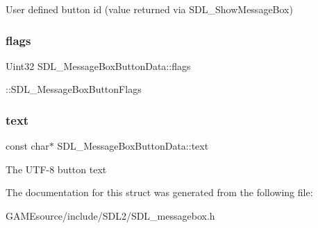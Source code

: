 User defined button id (value returned via S\+D\+L\+\_\+\+Show\+Message\+Box) \mbox{\label{struct_s_d_l___message_box_button_data_a426c8b5da0e718242c7840706d95de0b}} 
\subsubsection{\texorpdfstring{flags}{flags}}
{\footnotesize\ttfamily Uint32 S\+D\+L\+\_\+\+Message\+Box\+Button\+Data\+::flags}

\+::\+S\+D\+L\+\_\+\+Message\+Box\+Button\+Flags \mbox{\label{struct_s_d_l___message_box_button_data_af35f3062f0577159284c8828caaf08e4}} 
\subsubsection{\texorpdfstring{text}{text}}
{\footnotesize\ttfamily const char$\ast$ S\+D\+L\+\_\+\+Message\+Box\+Button\+Data\+::text}

The U\+T\+F-\/8 button text 

The documentation for this struct was generated from the following file\+:\begin{DoxyCompactItemize}
\item 
G\+A\+M\+Esource/include/\+S\+D\+L2/S\+D\+L\+\_\+messagebox.\+h\end{DoxyCompactItemize}
